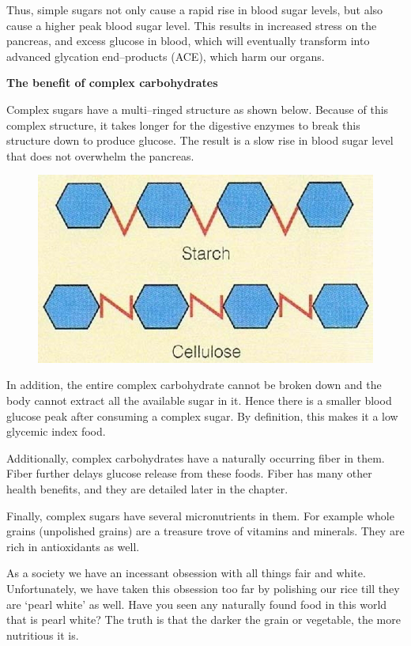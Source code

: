 Thus, simple sugars not only cause a rapid rise in blood sugar levels, but also cause a higher peak blood sugar level. This results in increased stress on the pancreas, and excess glucose in blood, which will eventually transform into advanced glycation end–products (ACE), which harm our organs.

\textbf{The benefit of complex carbohydrates}

Complex sugars have a multi–ringed structure as shown below. Because of this complex structure, it takes longer for the digestive enzymes to break this structure down to produce glucose. The result is a slow rise in blood sugar level that does not overwhelm the pancreas.

\begin{figure}
\includegraphics{images/081.jpg}
\end{figure}

In addition, the entire complex carbohydrate cannot be broken down and the body cannot extract all the available sugar in it. Hence there is a smaller blood glucose peak after consuming a complex sugar. By definition, this makes it a low glycemic index food.

Additionally, complex carbohydrates have a naturally occurring fiber in them. Fiber further delays glucose release from these foods. Fiber has many other health benefits, and they are detailed later in the chapter.

Finally, complex sugars have several micronutrients in them. For example whole grains (unpolished grains) are a treasure trove of vitamins and minerals. They are rich in antioxidants as well.

As a society we have an incessant obsession with all things fair and white. Unfortunately, we have taken this obsession too far by polishing our rice till they are ‘pearl white’ as well. Have you seen any naturally found food in this world that is pearl white? The truth is that the darker the grain or vegetable, the more nutritious it is.

